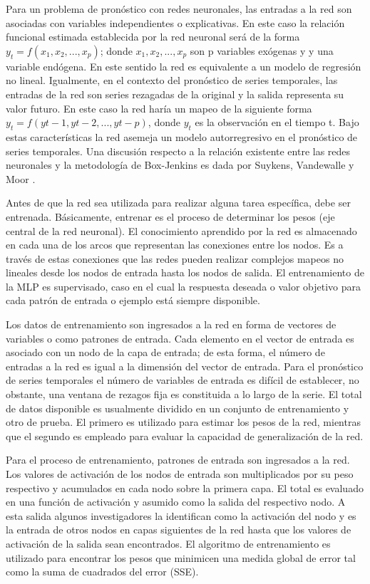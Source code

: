 \documentclass[
  12pt,
]{krantz}
\begin{document}
Para un problema de pronóstico con redes neuronales, las entradas a la red son asociadas con variables independientes o explicativas. En este caso la relación funcional estimada establecida por la red neuronal será de la forma \(y_{t}=f(x_{1}, x_{2},..., x_{p})\); donde \(x_{1}, x_{2},..., x_{p}\) son p variables exógenas y y una variable endógena. En este sentido la red es equivalente a un modelo de regresión no lineal. Igualmente, en el contexto del pronóstico de series temporales, las entradas de la red son series rezagadas de la original y la salida representa su valor futuro. En este caso la red haría un mapeo de la siguiente forma \(y_{t}= f (y{t-1}, y{t-2}, ..., y{t-p})\), donde \(y_{t}\) es la observación en el tiempo t. Bajo estas características la red asemeja un modelo autorregresivo en el pronóstico de series temporales. Una discusión respecto a la relación existente entre las redes neuronales y la metodología de Box-Jenkins es dada por Suykens, Vandewalle y Moor \cite{SVM}.

Antes de que la red sea utilizada para realizar alguna tarea específica, debe ser entrenada. Básicamente, entrenar es el proceso de determinar los pesos (eje central de la red neuronal). El conocimiento aprendido por la red es almacenado en cada una de los arcos que representan las conexiones entre los nodos. Es a través de estas conexiones que las redes pueden realizar complejos mapeos no lineales desde los nodos de entrada hasta los nodos de salida. El entrenamiento de la MLP es supervisado, caso en el cual la respuesta deseada o valor objetivo para cada patrón de entrada o ejemplo está siempre disponible.

Los datos de entrenamiento son ingresados a la red en forma de vectores de variables o como patrones de entrada. Cada elemento en el vector de entrada es asociado con un nodo de la capa de entrada; de esta forma, el número de entradas a la red es igual a la dimensión del vector de entrada. Para el pronóstico de series temporales el número de variables de entrada es difícil de establecer, no obstante, una ventana de rezagos fija es constituida a lo largo de la serie. El total de datos disponible es usualmente dividido en un conjunto de entrenamiento y otro de prueba. El primero es utilizado para estimar los pesos de la red, mientras que el segundo es empleado para evaluar la capacidad de generalización de la red.

Para el proceso de entrenamiento, patrones de entrada son ingresados a la red. Los valores de activación de los nodos de entrada son multiplicados por su peso respectivo y acumulados en cada nodo sobre la primera capa. El total es evaluado en una función de activación y asumido como la salida del respectivo nodo. A esta salida algunos investigadores la identifican como la activación del nodo y es la entrada de otros nodos en capas siguientes de la red hasta que los valores de activación de la salida sean encontrados. El algoritmo de entrenamiento es utilizado para encontrar los pesos que minimicen una medida global de error tal como la suma de cuadrados del error (SSE).
\end{document}
